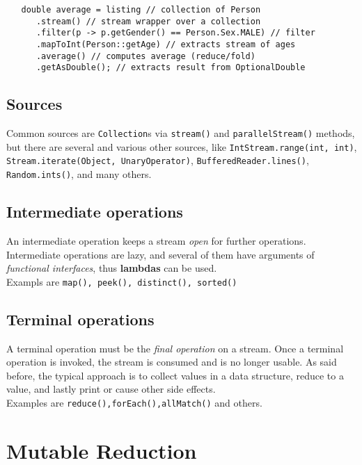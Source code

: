 \begin{lstlisting}
   double average = listing // collection of Person
      .stream() // stream wrapper over a collection
      .filter(p -> p.getGender() == Person.Sex.MALE) // filter
      .mapToInt(Person::getAge) // extracts stream of ages
      .average() // computes average (reduce/fold)
      .getAsDouble(); // extracts result from OptionalDouble
\end{lstlisting}

\subsection{Sources}
Common sources are \lstinline|Collection|s via \lstinline|stream()| and \lstinline|parallelStream()| methods,
but there are several and various other sources,
like \lstinline|IntStream.range(int, int)|, \lstinline|Stream.iterate(Object, UnaryOperator)|, \lstinline|BufferedReader.lines()|, \lstinline|Random.ints()|, and many others.

\subsection{Intermediate operations}
An intermediate operation keeps a stream \textit{open} for further operations.
Intermediate operations are lazy, and 
several of them have arguments of \textit{functional interfaces},
thus \textbf{lambdas} can be used.\\
Exampls are \lstinline|map(), peek(), distinct(), sorted()|

\subsection{Terminal operations}
A terminal operation must be the \textit{final operation} on a stream.
Once a terminal operation is invoked, the stream is consumed and is no longer usable.
As said before, the typical approach is to collect values in a data structure, reduce to a value, and lastly print or
cause other side effects.\\
Examples are \lstinline|reduce(),forEach(),allMatch()| and others.

\section{Mutable Reduction}

